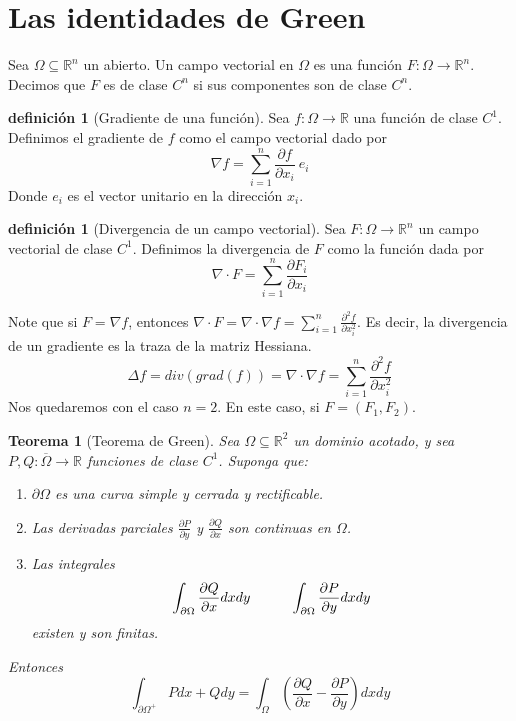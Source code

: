 \documentclass[11pt]{book}
\theoremstyle{plain}
\newtheorem{teo}[proposición]{Teorema}
\theoremstyle{definition}
\newtheorem{defi}[proposición]{definición}
\newcommand{\R}{\mathbb{R}}
\begin{document}
    \section{Las identidades de Green}
    Sea $\Omega \subseteq \R^{n}$ un abierto. Un campo vectorial en $\Omega$ es una función $F : \Omega \to \R^{n}$. Decimos que $F$ es de clase $C^{n}$ si sus componentes son de clase $C^{n}$.
    \begin{defi}[Gradiente de una función]
        Sea $f : \Omega \to \R$ una función de clase $C^{1}$. Definimos el gradiente de $f$ como el campo vectorial dado por
        \[
            \nabla f = \sum_{i=1}^{n} \frac{\partial f}{\partial x_{i}}\ e_{i}
        \]
        Donde $e_{i}$ es el vector unitario en la dirección $x_{i}$.
    \end{defi}
    \begin{defi}[Divergencia de un campo vectorial]
        Sea $F : \Omega \to \R^{n}$ un campo vectorial de clase $C^{1}$. Definimos la divergencia de $F$ como la función dada por
        \[
            \nabla \cdot F = \sum_{i=1}^{n} \frac{\partial F_{i}}{\partial x_{i}}
        \]
    \end{defi}
    Note que si $F = \nabla f$, entonces $\nabla \cdot F = \nabla \cdot \nabla f = \sum_{i=1}^{n} \frac{\partial^{2} f}{\partial x_{i}^{2}}$. Es decir, la divergencia de un gradiente es la traza de la matriz Hessiana.
    \[
        \Delta f = div(grad (f)) = \nabla \cdot \nabla f = \sum_{i=1}^{n} \frac{\partial^{2} f}{\partial x_{i}^{2}}  
    \]
    Nos quedaremos con el caso $n = 2$. En este caso, si $F = (F_{1}, F_{2})$.
    \begin{teo}[Teorema de Green]
        Sea $\Omega \subseteq \R^{2}$ un dominio acotado, y sea $P, Q: \overline{\Omega} \to \R$ funciones de clase $C^{1}$. Suponga que:
        \begin{enumerate}
            \item $\partial \Omega$ es una curva simple y cerrada y rectificable.
            \item Las derivadas parciales $\frac{\partial P}{\partial y}$ y $\frac{\partial Q}{\partial x}$ son continuas en $\Omega$.
            \item Las integrales
            \[
                \int_{\partial \Omega} \frac{\partial Q}{\partial x} dxdy \hspace{10mm} \int_{\partial \Omega} \frac{\partial P}{\partial y} dxdy
            \]
            existen y son finitas.
        \end{enumerate}
        Entonces
        \[
            \int_{\partial \Omega ^{+}} Pdx + Qdy = \int_{\Omega} \left(\frac{\partial Q}{\partial x} - \frac{\partial P}{\partial y}\right)dxdy
        \]

    \end{teo}
\end{document}
